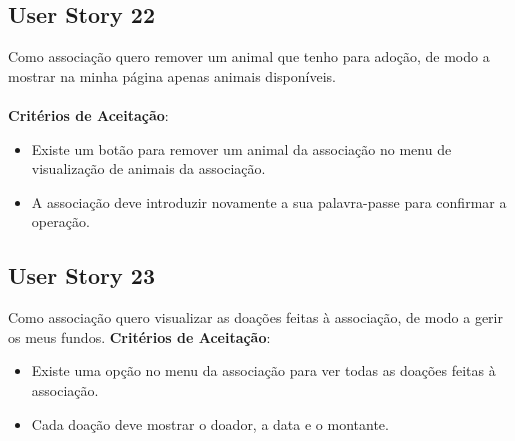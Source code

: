 \documentclass[a4paper,11pt]{article}
\begin{document}
\subsection{User Story 22}
Como associação quero remover um animal que tenho para adoção, de modo a mostrar na minha página apenas animais disponíveis.\\\\
\textbf{Critérios de Aceitação}:
\begin{itemize}
  \item Existe um botão para remover um animal da associação no menu de visualização de animais da associação.
  \item A associação deve introduzir novamente a sua palavra-passe para confirmar a operação.
\end{itemize}

\subsection{User Story 23}
Como associação quero visualizar as doações feitas à associação, de modo a gerir os meus fundos.
\textbf{Critérios de Aceitação}:
\begin{itemize}
  \item Existe uma opção no menu da associação para ver todas as doações feitas à associação.
  \item Cada doação deve mostrar o doador, a data e o montante.
\end{itemize}
\end{document}
